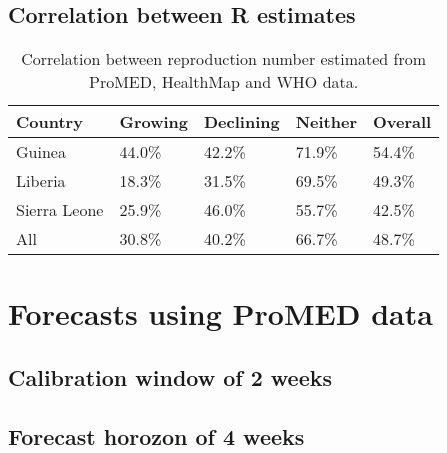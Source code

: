 \documentclass[11pt,]{article}
\begin{document}
\hypertarget{correlation-between-r-estimates}{%
  \subsection{Correlation between R estimates}\label{correlation-between-r-estimates}}

\begin{table}
  \centering
  \caption{Correlation between reproduction number estimated from
    ProMED, HealthMap and WHO data.}
  \label{tab:rcorr}
  \begin{tabular}{lllll}
    \toprule
    Country  & Growing & Declining & Neither & Overall \\
    \midrule
    Guinea  & 44.0\% & 42.2\% & 71.9\% & 54.4\% \\
    Liberia & 18.3\% & 31.5\% & 69.5\% & 49.3\% \\
    Sierra Leone & 25.9\% & 46.0\% & 55.7\% & 42.5\% \\
    All & 30.8\% & 40.2\% & 66.7\% & 48.7\% \\
    \bottomrule
  \end{tabular}
\end{table}


\hypertarget{forecasts-using-promed-data}{%
  \section{Forecasts using ProMED data}\label{forecasts-using-promed-data}}


\hypertarget{calibration-window-of-2-weeks}{%
  \subsection{Calibration window of 2 weeks}\label{calibration-window-of-2-weeks}}

\subsection{Forecast horozon of 4 weeks}
\end{document}

